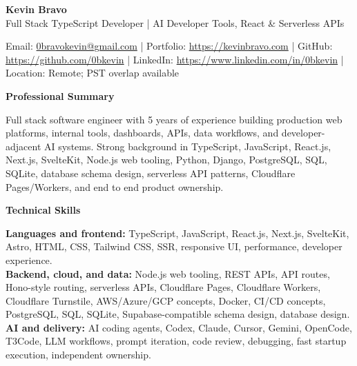 \documentclass[10pt]{article}
\begin{document}
\raggedright

\begin{center}
    {\LARGE \textbf{Kevin Bravo}}\\
    Full Stack TypeScript Developer | AI Developer Tools, React \& Serverless APIs \\
    \hrulefill
\end{center}

\begin{center}
    Email: \href{mailto:0bravokevin@gmail.com}{0bravokevin@gmail.com}
    | Portfolio: \href{https://kevinbravo.com}{https://kevinbravo.com}
    | GitHub: \href{https://github.com/0bkevin}{https://github.com/0bkevin}
    | LinkedIn: \href{https://www.linkedin.com/in/0bkevin/}{https://www.linkedin.com/in/0bkevin}
    | Location: Remote; PST overlap available
\end{center}

\vspace{2pt}
\begin{center}
    \textbf{Professional Summary}
\end{center}
\vspace{-6pt}
Full stack software engineer with 5 years of experience building production web platforms, internal tools, dashboards, APIs, data workflows, and developer-adjacent AI systems. Strong background in TypeScript, JavaScript, React.js, Next.js, SvelteKit, Node.js web tooling, Python, Django, PostgreSQL, SQL, SQLite, database schema design, serverless API patterns, Cloudflare Pages/Workers, and end to end product ownership.

\vspace{4pt}
\begin{center}
    \textbf{Technical Skills}
\end{center}
\vspace{-6pt}
\textbf{Languages and frontend:} TypeScript, JavaScript, React.js, Next.js, SvelteKit, Astro, HTML, CSS, Tailwind CSS, SSR, responsive UI, performance, developer experience. \\
\textbf{Backend, cloud, and data:} Node.js web tooling, REST APIs, API routes, Hono-style routing, serverless APIs, Cloudflare Pages, Cloudflare Workers, Cloudflare Turnstile, AWS/Azure/GCP concepts, Docker, CI/CD concepts, PostgreSQL, SQL, SQLite, Supabase-compatible schema design, database design. \\
\textbf{AI and delivery:} AI coding agents, Codex, Claude, Cursor, Gemini, OpenCode, T3Code, LLM workflows, prompt iteration, code review, debugging, fast startup execution, independent ownership.
\end{document}
